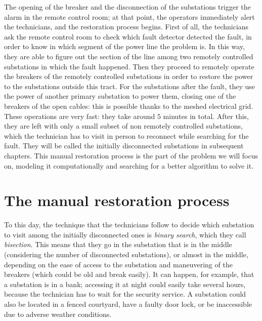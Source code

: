 The opening of the breaker and the disconnection of the substations trigger the alarm in the remote control room; at that point, the operators immediately alert the technicians, and the restoration process begins. First of all, the technicians ask the remote control room to check which fault detector detected the fault, in order to know in which segment of the power line the problem is. In this way, they are able to figure out the section of the line among two remotely controlled substations in which the fault happened. Then they proceed to remotely operate the breakers of the remotely controlled substations in order to restore the power to the substations outside this tract. For the substations after the fault, they use the power of another primary substation to power them, closing one of the breakers of the open cables: this is possible thanks to the meshed electrical grid. These operations are very fast: they take around $5$ minutes in total. After this, they are left with only a small subset of non remotely controlled substations, which the technician has to visit in person to reconnect while searching for the fault. They will be called the initially disconnected substations in subsequent chapters. This manual restoration process is the part of the problem we will focus on, modeling it computationally and searching for a better algorithm to solve it.


\section{The manual restoration process}

To this day, the technique that the technicians follow to decide which substation to visit among the initially disconnected ones is \emph{binary search}, which they call \emph{bisection}. This means that they go in the substation that is in the middle (considering the number of disconnected substations), or almost in the middle, depending on the ease of access to the substation and maneuvering of the breakers (which could be old and break easily). It can happen, for example, that a substation is in a bank; accessing it at night could easily take several hours, because the technician has to wait for the security service. A substation could also be located in a fenced courtyard, have a faulty door lock, or be inaccessible due to adverse weather conditions.


